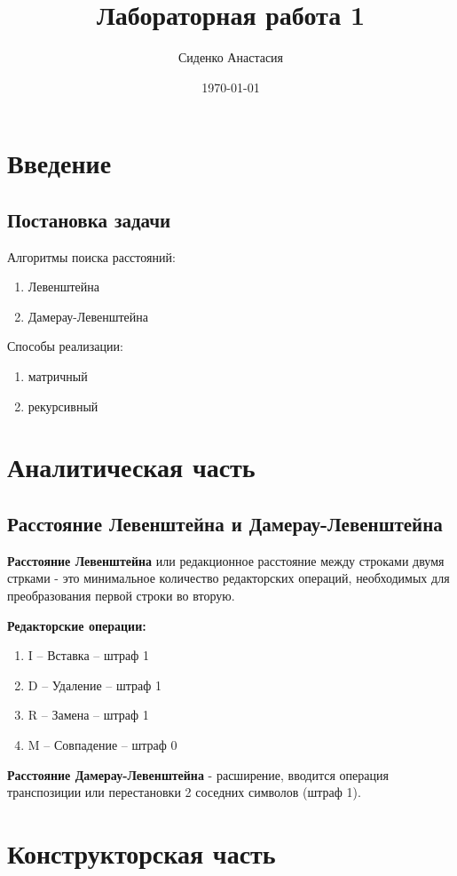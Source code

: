 \documentclass[a4paper,14pt]{report} %
\author{Сиденко Анастасия}
\title{Лабораторная работа 1}
\date{\today}
\begin{document}
\maketitle
\tableofcontents
\renewcommand{\chaptername}{Часть}

\chapter{Введение}
\section{Постановка задачи}
Алгоритмы поиска расстояний:
\begin{enumerate} 
  \item Левенштейна
  \item  Дамерау-Левенштейна
\end{enumerate} 
Способы реализации:
\begin{enumerate} 
  \item матричный
  \item  рекурсивный
\end{enumerate} 

\chapter{Аналитическая часть}
\section{Расстояние Левенштейна и Дамерау-Левенштейна}

\textbf{Расстояние Левенштейна} или редакционное расстояние между строками двумя стрками - это минимальное количество редакторских операций, необходимых для преобразования первой строки во вторую. 

\textbf{Редакторские операции: }
\begin{enumerate}
  \item I -- Вставка -- штраф 1
  \item D -- Удаление -- штраф 1
  \item R -- Замена -- штраф 1
  \item M -- Совпадение -- штраф 0
\end{enumerate}

\textbf{Расстояние Дамерау-Левенштейна} - расширение, вводится операция транспозиции или перестановки 2 соседних символов (штраф 1). 

\chapter{Конструкторская часть}
\end{document}
